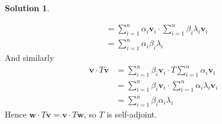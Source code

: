 \documentclass[11pt]{article}
\theoremstyle{definition}
\newtheorem*{solution}{Solution}
\newcommand{\vv}{\mathbf{v}}
\newcommand{\vw}{\mathbf{w}}
\begin{document}
\begin{solution}
\begin{enumerate}[label = \alph*)]
\begin{align*}
                &= \sum_{i=1}^n \alpha_i \vv_i \cdot \sum_{i=1}^n \beta_i \lambda_i \vv_i\\
                &= \sum_{i=1}^n \alpha_i\beta_i \lambda_i
            \end{align*}
            And similarly
            \begin{align*}
                \vv \cdot T\vv &= \sum_{i=1}^n \beta_i \vv_i \cdot T\sum_{i=1}^n \alpha_i \vv_i\\
                &= \sum_{i=1}^n \beta_i \vv_i \cdot \sum_{i=1}^n \alpha_i \lambda_i \vv_i\\
                &= \sum_{i=1}^n \beta_i\alpha_i \lambda_i
            \end{align*}
            Hence $\vw \cdot T\vv = \vv \cdot T\vw$, so $T$ is self-adjoint.
        \end{enumerate}
    \end{solution}
\end{document}
